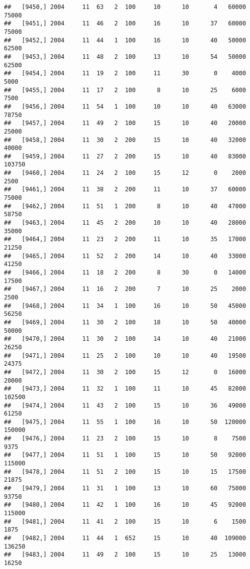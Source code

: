 \documentclass{article}\usepackage[]{graphicx}\usepackage[]{color}
\makeatletter
\newenvironment{kframe}{%
 \def\at@end@of@kframe{}%
 \ifinner\ifhmode%
  \def\at@end@of@kframe{\end{minipage}}%
  \begin{minipage}{\columnwidth}%
 \fi\fi%
 \def\FrameCommand##1{\hskip\@totalleftmargin \hskip-\fboxsep
 \colorbox{shadecolor}{##1}\hskip-\fboxsep
     \hskip-\linewidth \hskip-\@totalleftmargin \hskip\columnwidth}%
 \MakeFramed {\advance\hsize-\width
   \@totalleftmargin\z@ \linewidth\hsize
   \@setminipage}}%
 {\par\unskip\endMakeFramed%
 \at@end@of@kframe}
\newenvironment{knitrout}{}{} %
\makeatother
\begin{document}
\begin{knitrout}
\begin{kframe}
\begin{verbatim}
##   [9450,] 2004     11  63   2  100     10      10       4   60000   75000
##   [9451,] 2004     11  46   2  100     16      10      37   60000   75000
##   [9452,] 2004     11  44   1  100     16      10      40   50000   62500
##   [9453,] 2004     11  48   2  100     13      10      54   50000   62500
##   [9454,] 2004     11  19   2  100     11      30       0    4000    5000
##   [9455,] 2004     11  17   2  100      8      10      25    6000    7500
##   [9456,] 2004     11  54   1  100     10      10      40   63000   78750
##   [9457,] 2004     11  49   2  100     15      10      40   20000   25000
##   [9458,] 2004     11  30   2  200     15      10      40   32000   40000
##   [9459,] 2004     11  27   2  200     15      10      40   83000  103750
##   [9460,] 2004     11  24   2  100     15      12       0    2000    2500
##   [9461,] 2004     11  38   2  200     11      10      37   60000   75000
##   [9462,] 2004     11  51   1  200      8      10      40   47000   58750
##   [9463,] 2004     11  45   2  200     10      10      40   28000   35000
##   [9464,] 2004     11  23   2  200     11      10      35   17000   21250
##   [9465,] 2004     11  52   2  200     14      10      40   33000   41250
##   [9466,] 2004     11  18   2  200      8      30       0   14000   17500
##   [9467,] 2004     11  16   2  200      7      10      25    2000    2500
##   [9468,] 2004     11  34   1  100     16      10      50   45000   56250
##   [9469,] 2004     11  30   2  100     18      10      50   40000   50000
##   [9470,] 2004     11  30   2  100     14      10      40   21000   26250
##   [9471,] 2004     11  25   2  100     10      10      40   19500   24375
##   [9472,] 2004     11  30   2  100     15      12       0   16000   20000
##   [9473,] 2004     11  32   1  100     11      10      45   82000  102500
##   [9474,] 2004     11  43   2  100     15      10      36   49000   61250
##   [9475,] 2004     11  55   1  100     16      10      50  120000  150000
##   [9476,] 2004     11  23   2  100     15      10       8    7500    9375
##   [9477,] 2004     11  51   1  100     15      10      50   92000  115000
##   [9478,] 2004     11  51   2  100     15      10      15   17500   21875
##   [9479,] 2004     11  31   1  100     13      10      60   75000   93750
##   [9480,] 2004     11  42   1  100     16      10      45   92000  115000
##   [9481,] 2004     11  41   2  100     15      10       6    1500    1875
##   [9482,] 2004     11  44   1  652     15      10      40  109000  136250
##   [9483,] 2004     11  49   2  100     15      10      25   13000   16250

\end{verbatim}
\end{kframe}
\end{knitrout}
\end{document}

